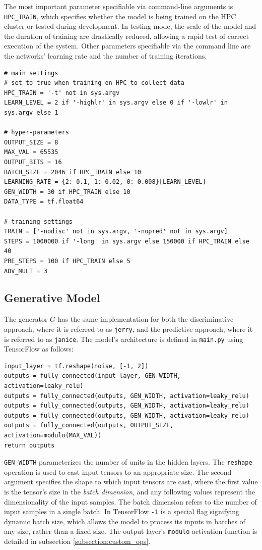 \documentclass[12pt, titlepage]{report}
\theoremstyle{definition}
\begin{document}
The most important parameter specifiable via command-line arguments is \texttt{HPC_TRAIN}, which specifies whether the model is being trained on the HPC cluster or tested during development. In testing mode, the scale of the model and the duration of training are drastically reduced, allowing a rapid test of correct execution of the system. Other parameters specifiable via the command line are the networks' learning rate and the number of training iterations.

\begin{verbatim}
# main settings
# set to true when training on HPC to collect data
HPC_TRAIN = '-t' not in sys.argv
LEARN_LEVEL = 2 if '-highlr' in sys.argv else 0 if '-lowlr' in sys.argv else 1

# hyper-parameters
OUTPUT_SIZE = 8
MAX_VAL = 65535
OUTPUT_BITS = 16
BATCH_SIZE = 2046 if HPC_TRAIN else 10
LEARNING_RATE = {2: 0.1, 1: 0.02, 0: 0.008}[LEARN_LEVEL]
GEN_WIDTH = 30 if HPC_TRAIN else 10
DATA_TYPE = tf.float64

# training settings
TRAIN = ['-nodisc' not in sys.argv, '-nopred' not in sys.argv]
STEPS = 1000000 if '-long' in sys.argv else 150000 if HPC_TRAIN else 40
PRE_STEPS = 100 if HPC_TRAIN else 5
ADV_MULT = 3
\end{verbatim}


\subsection{Generative Model}
The generator $G$ has the same implementation for both the discriminative approach, where it is referred to as \texttt{jerry}, and the predictive approach, where it is referred to as \texttt{janice}. The model's architecture is defined in \texttt{main.py} using TensorFlow as follows:

\begin{verbatim}
input_layer = tf.reshape(noise, [-1, 2])
outputs = fully_connected(input_layer, GEN_WIDTH, activation=leaky_relu)
outputs = fully_connected(outputs, GEN_WIDTH, activation=leaky_relu)
outputs = fully_connected(outputs, GEN_WIDTH, activation=leaky_relu)
outputs = fully_connected(outputs, GEN_WIDTH, activation=leaky_relu)
outputs = fully_connected(outputs, OUTPUT_SIZE, activation=modulo(MAX_VAL))
return outputs
\end{verbatim}

\texttt{GEN_WIDTH} parameterizes the number of units in the hidden layers. The \texttt{reshape} operation is used to cast input tensors to an appropriate size. The second argument specifies the shape to which input tensors are cast, where the first value is the tensor's size in the \textit{batch dimension}, and any following values represent the dimensionality of the input samples. The batch dimension refers to the number of input samples in a single batch. In TensorFlow \texttt{-1} is a special flag signifying dynamic batch size, which allows the model to process its inputs in batches of any size, rather than a fixed size. The output layer's \texttt{modulo} activation function is detailed in subsection \ref{subsection:custom_ops}.
\end{document}
